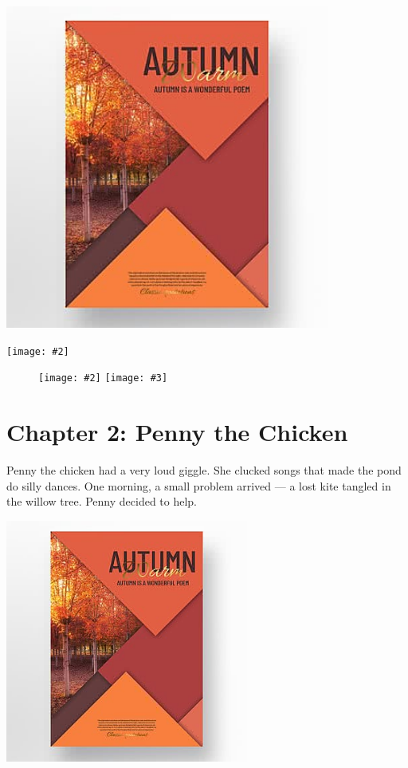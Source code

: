 \documentclass[12pt,openany]{book}
\newcommand{\bigpara}{\fontsize{18}{24}\selectfont}
\newcommand{\fullpageimage}[2][]{%
  \thispagestyle{empty}%
  \vspace*{0pt}%
  \begin{center}%
    \texttt{[image: \#2]}%
  \end{center}%
  \clearpage
}
\newcommand{\twospread}[3][]{%
  \thispagestyle{empty}%
  \begin{figure}[!p]\centering
    \texttt{[image: \#2]}%
    \hfill
    \texttt{[image: \#3]}%
  \end{figure}
  \clearpage
}
\begin{document}
\vspace{1.5cm}
\begin{center}
  \includegraphics[width=0.8\textwidth]{images/duckking_small.jpg}
\end{center}

\clearpage

\fullpageimage{images/spread_duck_king.jpg}

\twospread{images/left_page_scene.jpg}{images/right_page_scene.jpg}

\chapter*{Chapter 2: Penny the Chicken}

\bigpara
Penny the chicken had a very loud giggle. She clucked songs that made the pond do silly dances. 
One morning, a small problem arrived — a lost kite tangled in the willow tree. Penny decided to help.
\vspace{1cm}

\begin{center}
  \includegraphics[width=0.6\textwidth]{images/penny.jpg}
\end{center}
\end{document}
